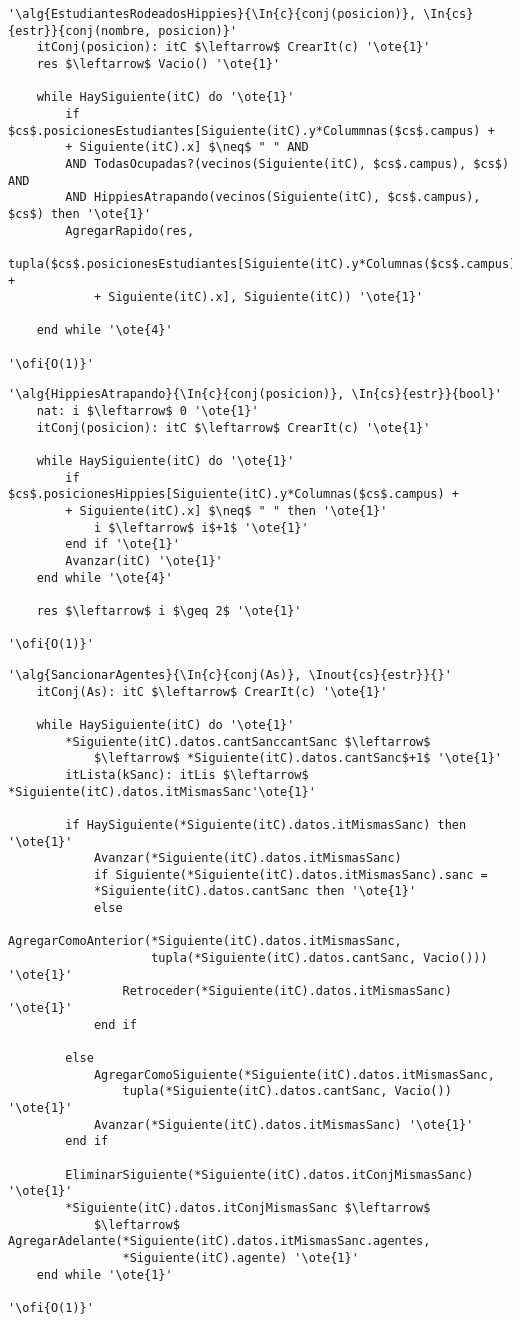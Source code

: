 \begin{lstlisting}[mathescape]
'\alg{EstudiantesRodeadosHippies}{\In{c}{conj(posicion)}, \In{cs}{estr}}{conj(nombre, posicion)}'
	itConj(posicion): itC $\leftarrow$ CrearIt(c) '\ote{1}'
	res $\leftarrow$ Vacio() '\ote{1}'

	while HaySiguiente(itC) do '\ote{1}'
		if $cs$.posicionesEstudiantes[Siguiente(itC).y*Colummnas($cs$.campus) +
		+ Siguiente(itC).x] $\neq$ " " AND
		AND TodasOcupadas?(vecinos(Siguiente(itC), $cs$.campus), $cs$) AND
		AND HippiesAtrapando(vecinos(Siguiente(itC), $cs$.campus), $cs$) then '\ote{1}'
		AgregarRapido(res,
			tupla($cs$.posicionesEstudiantes[Siguiente(itC).y*Columnas($cs$.campus) +
			+ Siguiente(itC).x], Siguiente(itC)) '\ote{1}'

	end while '\ote{4}'

'\ofi{O(1)}'
\end{lstlisting}

\begin{lstlisting}[mathescape]
'\alg{HippiesAtrapando}{\In{c}{conj(posicion)}, \In{cs}{estr}}{bool}'
	nat: i $\leftarrow$ 0 '\ote{1}'
	itConj(posicion): itC $\leftarrow$ CrearIt(c) '\ote{1}'

	while HaySiguiente(itC) do '\ote{1}'
		if $cs$.posicionesHippies[Siguiente(itC).y*Columnas($cs$.campus) +
		+ Siguiente(itC).x] $\neq$ " " then '\ote{1}'
			i $\leftarrow$ i$+1$ '\ote{1}'
		end if '\ote{1}'
		Avanzar(itC) '\ote{1}'
	end while '\ote{4}'

	res $\leftarrow$ i $\geq 2$ '\ote{1}'

'\ofi{O(1)}'
\end{lstlisting}

\begin{lstlisting}[mathescape]
'\alg{SancionarAgentes}{\In{c}{conj(As)}, \Inout{cs}{estr}}{}'
	itConj(As): itC $\leftarrow$ CrearIt(c) '\ote{1}'

	while HaySiguiente(itC) do '\ote{1}'
		*Siguiente(itC).datos.cantSanccantSanc $\leftarrow$
			$\leftarrow$ *Siguiente(itC).datos.cantSanc$+1$ '\ote{1}'
		itLista(kSanc): itLis $\leftarrow$ *Siguiente(itC).datos.itMismasSanc'\ote{1}'

		if HaySiguiente(*Siguiente(itC).datos.itMismasSanc) then '\ote{1}'
			Avanzar(*Siguiente(itC).datos.itMismasSanc)
			if Siguiente(*Siguiente(itC).datos.itMismasSanc).sanc =
			*Siguiente(itC).datos.cantSanc then '\ote{1}'
			else
				AgregarComoAnterior(*Siguiente(itC).datos.itMismasSanc,
					tupla(*Siguiente(itC).datos.cantSanc, Vacio())) '\ote{1}'
				Retroceder(*Siguiente(itC).datos.itMismasSanc) '\ote{1}'
			end if

		else
			AgregarComoSiguiente(*Siguiente(itC).datos.itMismasSanc,
				tupla(*Siguiente(itC).datos.cantSanc, Vacio()) '\ote{1}'
			Avanzar(*Siguiente(itC).datos.itMismasSanc) '\ote{1}'
		end if

		EliminarSiguiente(*Siguiente(itC).datos.itConjMismasSanc) '\ote{1}'
		*Siguiente(itC).datos.itConjMismasSanc $\leftarrow$
			$\leftarrow$ AgregarAdelante(*Siguiente(itC).datos.itMismasSanc.agentes,
				*Siguiente(itC).agente) '\ote{1}'
	end while '\ote{1}'

'\ofi{O(1)}'
\end{lstlisting}

